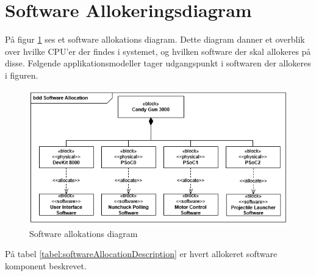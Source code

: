 \section{Software Allokeringsdiagram}
På figur \ref{fig:softwareAllocation} ses et software allokations diagram. Dette diagram danner et overblik over hvilke CPU'er der findes i systemet, og hvilken software der skal allokeres på disse. Følgende applikationsmodeller tager udgangspunkt i softwaren der allokeres i figuren.

\begin{figure}[H]
	\centering
	\includegraphics[width=\textwidth]{Systemarkitektur/images/SoftwareAllocation.png}
	\caption{Software allokations diagram}
	\label{fig:softwareAllocation}
\end{figure}

På tabel \ref{tabel:softwareAllocationDescription} er hvert allokeret software komponent beskrevet.

